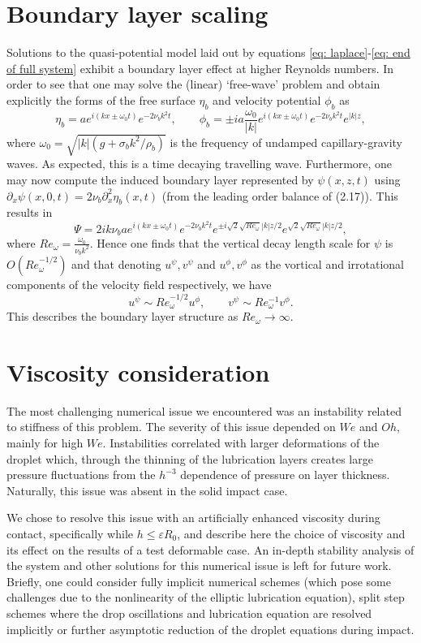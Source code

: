 \section{Boundary layer scaling}\label{App: Boundary}
Solutions to the quasi-potential model laid out by equations \eqref{eq: laplace}-\eqref{eq: end of full system} exhibit a boundary layer effect at higher Reynolds numbers. In order to see that one may solve the (linear) `free-wave' problem and obtain explicitly the forms of the free surface $\eta_b$ and velocity potential $\phi_b$ as 
\begin{equation*}
    \eta_b = a e^{i(kx \pm \omega_0 t)} e^{-2\nu_b k^2 t}, \qquad \phi_b = \pm i a \frac{\omega_0}{|k|} e^{i(kx \pm \omega_0 t)} e^{-2\nu_b k^2 t} e^{|k|z},
\end{equation*}
where $\omega_0 = \sqrt{|k|(g + \sigma_b k^2/\rho_b)}$ is the frequency of undamped capillary-gravity waves. As expected, this is a time decaying travelling wave. Furthermore, one may now compute the induced boundary layer represented by $\psi(x,z,t)$ using $\partial_x \psi(x,0,t) = 2\nu_b \partial_x^2 \eta_b(x,t)$ (from the leading order balance of (2.17)). This results in 
$$\Psi = 2ik\nu_b a e^{i(kx \pm \omega_0 t)} e^{-2\nu_b k^2 t}e^{\pm i\sqrt{2}\sqrt{Re_\omega}|k|z/2}e^{ \sqrt{2}\sqrt{Re_\omega}|k|z/2},$$
where $Re_\omega = \frac{\omega_0}{\nu_b k^2}$. Hence one finds that the vertical decay length scale for $\psi$ is $O(Re_\omega^{-1/2})$ and that denoting $u^\psi,v^\psi$ and $u^\phi,v^\phi$ as the vortical and irrotational components of the velocity field respectively, we have
$$u^\psi \sim Re_\omega^{-1/2} u^\phi, \qquad v^\psi \sim Re_\omega^{-1} v^\phi.$$
This describes the boundary layer structure as $Re_\omega \rightarrow \infty$.

\section{Viscosity consideration}\label{app: Visc}
 
The most challenging numerical issue we encountered was an instability related to stiffness of this problem. The severity of this issue depended on $W\!e$ and $Oh$, mainly for high $W\!e$. Instabilities correlated with larger deformations of the droplet which, through the thinning of the lubrication layers creates large pressure fluctuations from the $h^{-3}$ dependence of pressure on layer thickness. Naturally, this issue was absent in the solid impact case. 

We chose to resolve this issue with an artificially enhanced viscosity during contact, specifically while $h \le \varepsilon R_0$, and describe here the choice of viscosity and its effect on the results of a test deformable case. An in-depth stability analysis of the system and other solutions for this numerical issue is left for future work. Briefly, one could consider fully implicit numerical schemes (which pose some challenges due to the nonlinearity of the elliptic lubrication equation), split step schemes where the drop oscillations and lubrication equation are resolved implicitly or further asymptotic reduction of the droplet equations during impact.   


